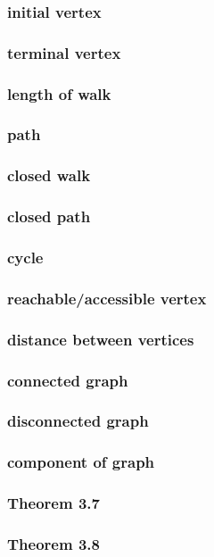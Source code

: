 \documentclass[a4paper]{article}
\begin{document}
\subsubsection*{initial vertex}
\subsubsection*{terminal vertex}
\subsubsection*{length of walk}
\subsubsection*{path}
\subsubsection*{closed walk}
\subsubsection*{closed path}
\subsubsection*{cycle}
\subsubsection*{reachable/accessible vertex}
\subsubsection*{distance between vertices}
\subsubsection*{connected graph}
\subsubsection*{disconnected graph}
\subsubsection*{component of graph}
\subsubsection*{Theorem 3.7}
\subsubsection*{Theorem 3.8}
\end{document}
